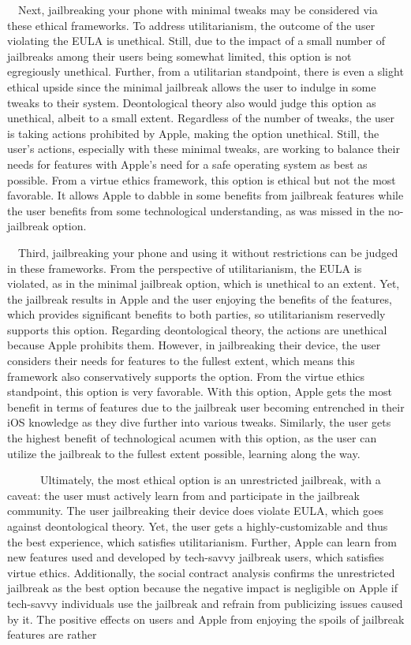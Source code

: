 \documentclass{article}
\begin{document}
\ \ Next, jailbreaking your phone with minimal tweaks may be considered via these ethical frameworks. To address
utilitarianism, the outcome of the user violating the EULA is unethical. Still, due to the impact of a small number of
jailbreaks among their users being somewhat limited, this option is not egregiously unethical. Further, from a
utilitarian standpoint, there is even a slight ethical upside since the minimal jailbreak allows the user to indulge in
some tweaks to their system. Deontological theory also would judge this option as unethical, albeit to a small extent.
Regardless of the number of tweaks, the user is taking actions prohibited by Apple, making the option unethical. Still,
the user's actions, especially with these minimal tweaks, are working to balance their needs for features with Apple's
need for a safe operating system as best as possible. From a virtue ethics framework, this option is ethical but not
the most favorable. It allows Apple to dabble in some benefits from jailbreak features while the user benefits from
some technological understanding, as was missed in the no-jailbreak option.

\ \ Third, jailbreaking your phone and using it without restrictions can be judged in these frameworks. From the
perspective of utilitarianism, the EULA is violated, as in the minimal jailbreak option, which is unethical to an
extent. Yet, the jailbreak results in Apple and the user enjoying the benefits of the features, which provides
significant benefits to both parties, so utilitarianism reservedly supports this option. Regarding deontological
theory, the actions are unethical because Apple prohibits them. However, in jailbreaking their device, the user
considers their needs for features to the fullest extent, which means this framework also conservatively supports the
option. From the virtue ethics standpoint, this option is very favorable. With this option, Apple gets the most benefit
in terms of features due to the jailbreak user becoming entrenched in their iOS knowledge as they dive further into
various tweaks. Similarly, the user gets the highest benefit of technological acumen with this option, as the user can
utilize the jailbreak to the fullest extent possible, learning along the way.

\ \ \ \ \ \ Ultimately, the most ethical option is an unrestricted jailbreak, with a caveat: the user must actively
learn from and participate in the jailbreak community. The user jailbreaking their device does violate EULA, which goes
against deontological theory. Yet, the user gets a highly-customizable and thus the best experience, which satisfies
utilitarianism. Further, Apple can learn from new features used and developed by tech-savvy jailbreak users, which
satisfies virtue ethics. Additionally, the social contract analysis confirms the unrestricted jailbreak as the best
option because the negative impact is negligible on Apple if tech-savvy individuals use the jailbreak and refrain from
publicizing issues caused by it. The positive effects on users and Apple from enjoying the spoils of jailbreak features
are rather 
\end{document}
